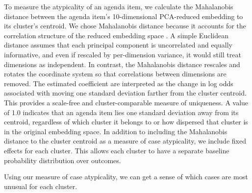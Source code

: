 To measure the atypicality of an agenda item, we calculate the Mahalanobis distance between the agenda item's 10-dimensional PCA-reduced embedding to its cluster's centroid. We chose Mahalanobis distance because it accounts for the correlation structure of the reduced embedding space \citep[p. 93]{rencher2012}. A simple Euclidean distance assumes that each principal component is uncorrelated and equally informative, and even if rescaled by per-dimension variance, it would still treat dimensions as independent. In contrast, the Mahalanobis distance rescales and rotates the coordinate system so that correlations between dimensions are removed. The estimated coefficient are interpreted as the change in log odds associated with moving one standard deviation farther from the cluster centroid. This provides a scale-free and cluster-comparable measure of uniqueness. A value of 1.0 indicates that an agenda item lies one standard deviation away from its centroid, regardless of which cluster it belongs to or how dispersed that cluster is in the original embedding space.
In addition to including the Mahalanobis distance to the cluster centroid as a measure of case atypicality, we include fixed effects for each cluster. This allows each cluster to have a separate baseline probability distribution over outcomes.

Using our measure of case atypicality, we can get a sense of which cases are most unusual for each cluster. 



